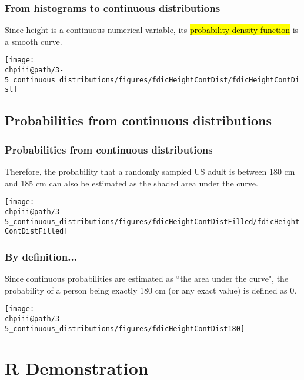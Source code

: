 \documentclass[slidestop,compress,mathserif]{beamer}
\makeatletter
\def\chpiii@path{../../Chp 3}
\makeatother
\begin{document}
\begin{frame}
\frametitle{From histograms to continuous distributions}

Since height is a continuous numerical variable, its \hl{probability density function} is a smooth curve.

\begin{center}
\texttt{[image: \\chpiii@path/3-5\_continuous\_distributions/figures/fdicHeightContDist/fdicHeightContDist]}
\end{center}

\end{frame}


\subsection{Probabilities from continuous distributions}

\begin{frame}
\frametitle{Probabilities from continuous distributions}

Therefore, the probability that a randomly sampled US adult is between 180 cm and 185 cm can also be estimated as the shaded area under the curve.

\begin{center}
\texttt{[image: \\chpiii@path/3-5\_continuous\_distributions/figures/fdicHeightContDistFilled/fdicHeightContDistFilled]}
\end{center}


\end{frame}


\begin{frame}
\frametitle{By definition...}

Since continuous probabilities are estimated as ``the area under the curve", the probability of a person being exactly 180 cm (or any exact value) is defined as 0.

\begin{center}
\texttt{[image: \\chpiii@path/3-5\_continuous\_distributions/figures/fdicHeightContDist180]}
\end{center}

\end{frame}


\section{R Demonstration}
\end{document}
